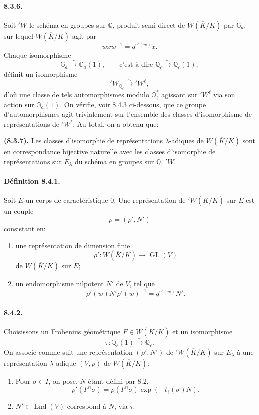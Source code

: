 \documentclass[10pt]{article}
\newcommand{\GL}{\operatorname{GL}}
\newcommand{\iso}{\xrightarrow{\sim}}
\providecommand{\GL}{\operatorname{GL}}
\providecommand{\End}{\operatorname{End}}
\providecommand{\GL}{\operatorname{GL}}
\providecommand{\End}{\operatorname{End}}
\begin{document}
\paragraph{8.3.6.} Soit \({}'W\) le schéma en groupes sur \(\mathbb Q\), produit semi-direct de \(W(\overline K/K)\) par \(\mathbb G_a\), sur lequel \(W(\overline K/K)\) agit par
\[
w x w^{-1}=q^{v'(w)}x.
\]
Chaque isomorphisme
\[
\mathbb G_a\iso\mathbb G_a(1),
\qquad\text{c'est-à-dire }\mathbb Q_\ell\iso\mathbb Q_\ell(1),
\]
définit un isomorphisme
\[
{}'W_{\mathbb Q_\ell}\iso{}'W^\ell,
\]
d'où une classe de tels automorphismes modulo \(\mathbb Q_\ell^*\) agissant sur \({}'W^\ell\) via son action sur \(\mathbb G_a(1)\). On vérifie, voir 8.4.3 ci-dessous, que ce groupe d'automorphismes agit trivialement sur l'ensemble des classes d'isomorphisme de représentations de \({}'W^\ell\). Au total, on a obtenu que:

\noindent\textbf{(8.3.7).} Les classes d'isomorphie de représentations \(\lambda\)-adiques de \(W(\overline K/K)\) sont en correspondance bijective naturelle avec les classes d'isomorphie de représentations sur \(E_\lambda\) du schéma en groupes sur \(\mathbb Q\), \({}'W\).

\paragraph{Définition 8.4.1.} Soit \(E\) un corps de caractéristique \(0\). Une représentation de \({}'W(\overline K/K)\) sur \(E\) est un couple
\[
\rho=(\rho',N')
\]
consistant en:
\begin{enumerate}[label=(\alph*)]
\item une représentation de dimension finie
\[
\rho':W(\overline K/K)\longrightarrow \GL(V)
\]
de \(W(\overline K/K)\) sur \(E\);
\item un endomorphisme nilpotent \(N'\) de \(V\), tel que
\[
\tag{8.4.1.1}
\rho'(w)N'\rho'(w)^{-1}=q^{v'(w)}N'.
\]
\end{enumerate}

\paragraph{8.4.2.} Choisissons un Frobenius géométrique \(F\in W(\overline K/K)\) et un isomorphisme
\[
\tau:\mathbb Q_\ell(1)\iso\mathbb Q_\ell.
\]
On associe comme suit une représentation \((\rho',N')\) de \({}'W(\overline K/K)\) sur \(E_\lambda\) à une représentation \(\lambda\)-adique \((V,\rho)\) de \(W(\overline K/K)\):
\begin{enumerate}[label=(\alph*)]
\item Pour \(\sigma\in I\), on pose, \(N\) étant défini par 8.2,
\[
\rho'(F^n\sigma)=\rho(F^n\sigma)\exp(-t_\ell(\sigma)N).
\]
\item \(N'\in\End(V)\) correspond à \(N\), via \(\tau\).
\end{enumerate}
\end{document}
